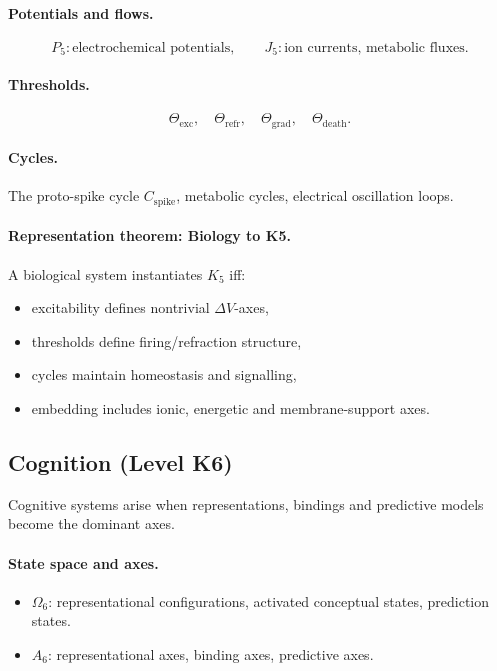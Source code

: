 \paragraph{Potentials and flows.}
\[
  P_5: \text{electrochemical potentials},\qquad
  J_5: \text{ion currents, metabolic fluxes}.
\]

\paragraph{Thresholds.}
\[
  \Theta_{\mathrm{exc}},\quad
  \Theta_{\mathrm{refr}},\quad
  \Theta_{\mathrm{grad}},\quad
  \Theta_{\mathrm{death}}.
\]

\paragraph{Cycles.}
The proto-spike cycle \(C_{\mathrm{spike}}\), metabolic cycles, electrical
oscillation loops.

\paragraph{Representation theorem: Biology to K5.}
A biological system instantiates \(K_5\) iff:
\begin{itemize}
  \item excitability defines nontrivial \(\Delta V\)-axes,
  \item thresholds define firing/refraction structure,
  \item cycles maintain homeostasis and signalling,
  \item embedding includes ionic, energetic and membrane-support axes.
\end{itemize}

\subsection{Cognition (Level K6)}

Cognitive systems arise when representations, bindings and predictive models
become the dominant axes.

\paragraph{State space and axes.}
\begin{itemize}
  \item \(\Omega_6\): representational configurations, activated conceptual
        states, prediction states.
  \item \(A_6\): representational axes, binding axes, predictive axes.
\end{itemize}

